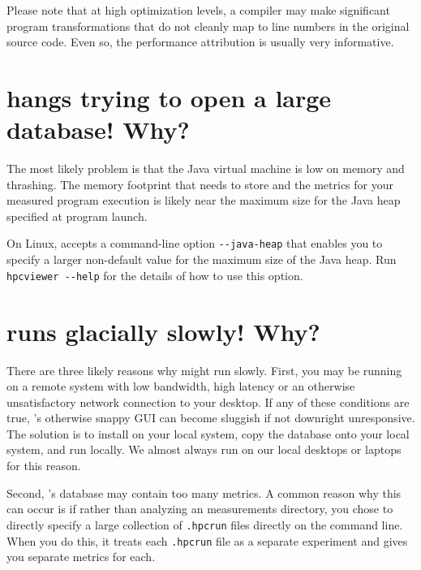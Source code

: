 \documentclass[11pt,letterpaper]{report}
\begin{document}
Please note that at high optimization levels, a compiler may make significant program transformations that do not cleanly map to line numbers in the original source code.
Even so, the performance attribution is usually very informative.



\section{\hpcviewer{} hangs trying to open a large database! Why?}

The most likely problem is that the Java virtual machine is low on memory and thrashing. The memory footprint that \hpcviewer{} needs to store and the metrics for your measured program execution is likely near the maximum size for the Java heap specified at program launch.

On Linux, \hpcviewer{} accepts a command-line option \verb|--java-heap| that enables you to specify a larger non-default value for the maximum size of the Java heap. Run \verb|hpcviewer --help| for the details of how to use this option.



\section{\hpcviewer{} runs glacially slowly! Why?}

There are three likely reasons why \hpcviewer{} might run slowly.
First, you may be running \hpcviewer{} on a remote system with low bandwidth, high latency or an otherwise unsatisfactory network connection to your desktop.
If any of these conditions are true, \hpcviewer{}'s otherwise snappy GUI can become sluggish if not downright unresponsive.
The solution is to install \hpcviewer{} on your local system, copy the database onto your local system, and run \hpcviewer{} locally.
We almost always run \hpcviewer{} on our local desktops or laptops for this reason.

Second, \HPCToolkit{}'s database may contain too many metrics.
A common reason why this can occur is if rather than analyzing an \HPCToolkit{}  measurements directory, you chose to directly specify a large collection of {\tt .hpcrun} files directly on the command line. When you do this, it treats each {\tt .hpcrun} file as a separate experiment and gives you separate metrics for each.
\end{document}
